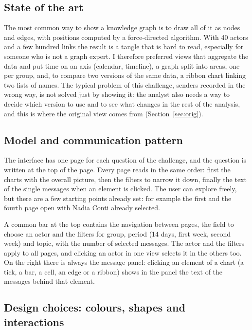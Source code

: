\documentclass[11pt,a4paper]{article}
\begin{document}
\subsection{State of the art}
The most common way to show a knowledge graph is to draw all of it as nodes and edges, with positions computed by a
force-directed algorithm. With 40 actors and a few hundred links the result is a tangle that is hard to read,
especially for someone who is not a graph expert. I therefore preferred views that aggregate the data and put time on
an axis (calendar, timeline), a graph split into areas, one per group, and, to compare two versions of the same data, a
ribbon chart linking two lists of names. The typical problem of this challenge, senders recorded in the wrong way, is
not solved just by showing it: the analyst also needs a way to decide which version to use and to
see what changes in the rest of the analysis, and this is where the original view comes from
(Section~\ref{sec:orig}).

\subsection{Model and communication pattern}
The interface has one page for each question of the challenge, and the question is written at the top of the page.
Every page reads in the same order: first the charts with the overall picture, then the filters to narrow it down,
finally the text of the single messages when an element is clicked. The user can explore freely, but there are a few
starting points already set: for example the
first and the fourth page open with Nadia Conti already selected.

A common bar at the top contains the navigation between pages, the field to choose an actor and the filters for
group, period (14 days, first week, second week) and topic, with the number of selected messages. The actor and the
filters apply to all pages, and clicking an actor in one view selects it in the others too. On the right there is
always the message panel: clicking an element of a chart (a tick, a bar, a cell, an edge or a ribbon) shows in the
panel the text of the messages behind that element.

\subsection{Design choices: colours, shapes and interactions}
\end{document}
